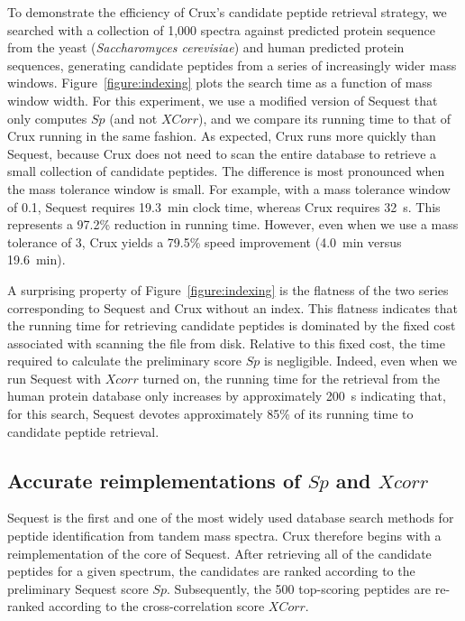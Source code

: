 \documentclass[12pt]{article}
\begin{document}
To demonstrate the efficiency of Crux's candidate peptide retrieval
strategy, we searched with a collection of 1,000 spectra against
predicted protein sequence from the yeast ({\em Saccharomyces
cerevisiae}) and human predicted protein sequences, generating
candidate peptides from a series of increasingly wider mass windows.
Figure~\ref{figure:indexing} plots the search time as a function of
mass window width.  For this experiment, we use a modified version of
{\sc Sequest} that only computes $Sp$ (and not $XCorr$), and we
compare its running time to that of Crux running in the same fashion.
As expected, Crux runs more quickly than {\sc Sequest}, because Crux
does not need to scan the entire database to retrieve a small
collection of candidate peptides.  The difference is most pronounced
when the mass tolerance window is small.  For example, with a mass
tolerance window of 0.1, {\sc Sequest} requires 19.3~min clock time,
whereas Crux requires 32~s.  This represents a 97.2\% reduction in
running time. However, even when we use a mass tolerance of 3, Crux
yields a 79.5\% speed improvement (4.0~min versus 19.6~min).

A surprising property of Figure~\ref{figure:indexing} is the flatness
of the two series corresponding to {\sc Sequest} and Crux without an
index.  This flatness indicates that the running time for retrieving
candidate peptides is dominated by the fixed cost associated with
scanning the file from disk.  Relative to this fixed cost, the time
required to calculate the preliminary score $Sp$ is negligible.
Indeed, even when we run {\sc Sequest} with $Xcorr$ turned on, the
running time for the retrieval from the human protein database only
increases by approximately 200~s indicating that, for this search,
{\sc Sequest} devotes approximately 85\% of its running time to
candidate peptide retrieval.

\subsection{Accurate reimplementations of $Sp$ and $Xcorr$}

{\sc Sequest} is the first and one of the most widely used database
search methods for peptide identification from tandem mass spectra.
Crux therefore begins with a reimplementation of the core of {\sc
Sequest}.  After retrieving all of the candidate peptides for a given
spectrum, the candidates are ranked according to the preliminary {\sc
Sequest} score $Sp$.  Subsequently, the 500 top-scoring peptides are
re-ranked according to the cross-correlation score $XCorr$.
\end{document}
